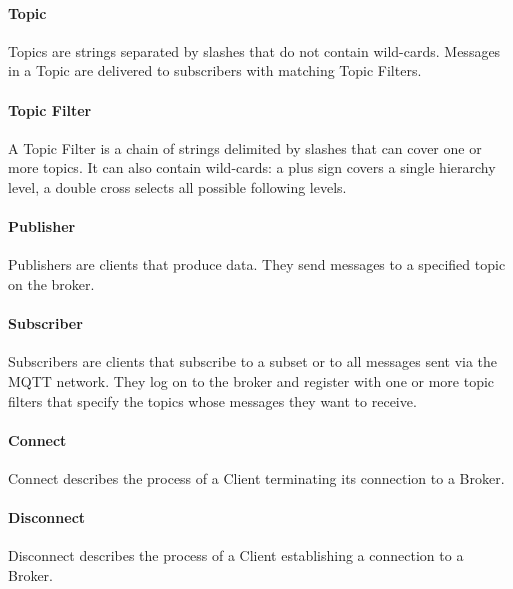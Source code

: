 \paragraph{Topic}
Topics are strings separated by slashes that do not contain wild-cards.
Messages in a Topic are delivered to subscribers with matching Topic Filters.
\paragraph{Topic Filter}
A Topic Filter is a chain of strings delimited by slashes that 
can cover one or more topics. 
It can also contain wild-cards: a plus sign covers a single hierarchy level, a double cross selects all possible following levels.
\paragraph{Publisher}
Publishers are clients that produce data.
They send messages to a specified topic on the broker.
\paragraph{Subscriber}
Subscribers are clients that subscribe to a subset or to all messages sent via the
MQTT network.
They log on to the broker and register with one or more topic filters that specify the topics whose messages they want to receive.
\paragraph{Connect}
Connect describes the process of a Client terminating its connection to a Broker.
\paragraph{Disconnect}
Disconnect describes the process of a Client establishing a connection to a Broker.

